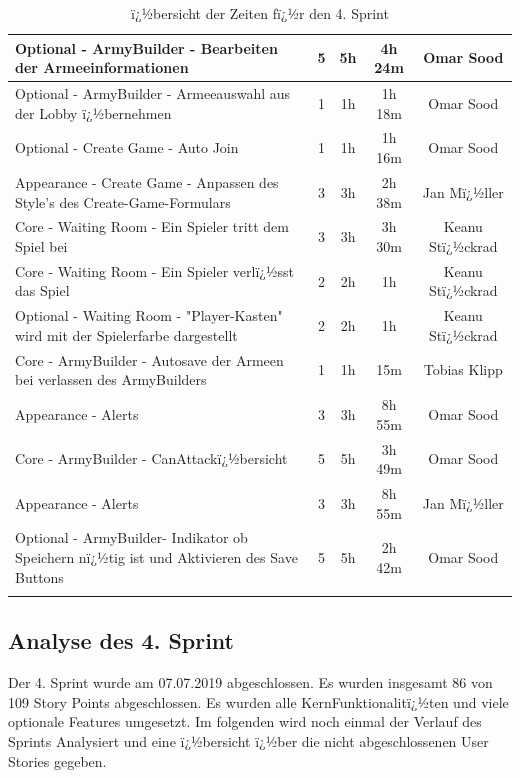 \documentclass[12pt, titlepage]{scrartcl}
\begin{document}
\begin{center}
\begin{longtable}{p{6cm} c c c c }
					Optional - ArmyBuilder - Bearbeiten der Armeeinformationen & 5 & 5h & 4h 24m & Omar Sood\\ \hline
					
					Optional - ArmyBuilder - Armeeauswahl aus der Lobby ï¿½bernehmen & 1 & 1h & 1h 18m & Omar Sood\\ \hline
					
					Optional - Create Game - Auto Join & 1 & 1h & 1h 16m & Omar Sood\\ \hline
					
					Appearance - Create Game - Anpassen des Style's des Create-Game-Formulars & 3 & 3h & 2h 38m & Jan Mï¿½ller\\ \hline
					
					Core - Waiting Room - Ein Spieler tritt dem Spiel bei & 3 & 3h & 3h 30m & Keanu Stï¿½ckrad\\ \hline
					
					Core - Waiting Room - Ein Spieler verlï¿½sst das Spiel & 2 & 2h & 1h & Keanu Stï¿½ckrad \\ \hline
					
					Optional - Waiting Room - "Player-Kasten" wird mit der Spielerfarbe dargestellt & 2 & 2h & 1h & Keanu Stï¿½ckrad\\ \hline
					
					Core - ArmyBuilder - Autosave der Armeen bei verlassen des ArmyBuilders & 1 & 1h & 15m & Tobias Klipp\\
					
					Appearance - Alerts & 3 & 3h & 8h 55m & Omar Sood \\ \hline
					
					Core - ArmyBuilder - \glqq CanAttack\grqq ï¿½bersicht & 5 & 5h & 3h 49m & Omar Sood \\ \hline
					
					Appearance - Alerts & 3 & 3h & 8h 55m & Jan Mï¿½ller \\ \hline
					
					Optional - ArmyBuilder- Indikator ob Speichern nï¿½tig ist und Aktivieren des Save Buttons & 5 & 5h & 2h 42m & Omar Sood\\
					\caption{ï¿½bersicht der Zeiten fï¿½r den 4. Sprint} \\
				\end{longtable}
			\end{center}
			
		\subsection{Analyse des 4. Sprint}
			Der 4. Sprint wurde am 07.07.2019 abgeschlossen. Es wurden insgesamt 86 von 109 Story Points abgeschlossen. Es wurden alle KernFunktionalitï¿½ten und viele optionale Features umgesetzt. Im folgenden wird noch einmal der Verlauf des Sprints Analysiert und eine ï¿½bersicht ï¿½ber die nicht abgeschlossenen User Stories gegeben. 
		
\end{document}
